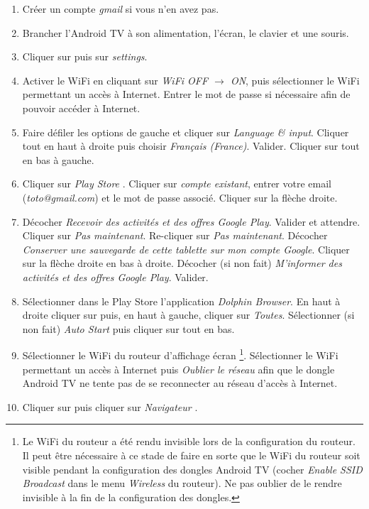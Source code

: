\documentclass[a4paper]{ffco-rapport}
\begin{document}
	\begin{enumerate}
		\item Créer un compte \emph{gmail} si vous n'en avez pas.
		\item Brancher l'Android TV à son alimentation, l'écran, le clavier et une souris.
		\item Cliquer sur  puis sur \emph{settings}. 
		\item Activer le WiFi en cliquant sur \emph{WiFi OFF $\rightarrow$ ON}, puis sélectionner le WiFi permettant un accès à Internet.
					Entrer le mot de passe si nécessaire afin de pouvoir accéder à Internet.
		\item Faire défiler les options de gauche et cliquer sur \emph{Language \& input}.
					Cliquer tout en haut à droite puis choisir \emph{Français (France)}. Valider.
					Cliquer sur  tout en bas à gauche.
		\item Cliquer sur \emph{Play Store} .
					Cliquer sur \emph{compte existant}, entrer votre email (\emph{toto@gmail.com}) et le mot de passe associé.
					Cliquer sur la flèche droite.
		\item Décocher \emph{Recevoir des activités et des offres Google Play}. Valider et attendre.
					Cliquer sur \emph{Pas maintenant}. Re-cliquer sur \emph{Pas maintenant}.
					Décocher \emph{Conserver une sauvegarde de cette tablette sur mon compte Google}.
					Cliquer sur la flèche droite en bas à droite.
					Décocher (si non fait) \emph{M'informer des activités et des offres Google Play}. Valider.
		\item Sélectionner dans le Play Store l'application \emph{Dolphin Browser}.
					En haut à droite cliquer sur  puis, en haut à gauche, cliquer sur \emph{Toutes}.
					Sélectionner (si non fait) \emph{Auto Start} puis cliquer sur  tout en bas.
		\item Sélectionner le WiFi du routeur d'affichage écran
					\footnote{Le WiFi du routeur a été rendu invisible lors de la configuration du routeur.
						Il peut être nécessaire à ce stade de faire en sorte que le WiFi du routeur soit visible pendant la configuration des dongles
						Android TV (cocher \emph{Enable SSID Broadcast} dans le menu \emph{Wireless} du routeur).
						Ne pas oublier de le rendre invisible à la fin de la configuration des dongles.
					}. Sélectionner le WiFi permettant un accès à Internet puis \emph{Oublier le réseau} afin que le dongle Android TV ne tente pas de se reconnecter au réseau d'accès à Internet.
		\item Cliquer sur  puis cliquer sur \emph{Navigateur} .

\end{enumerate}
\end{document}
